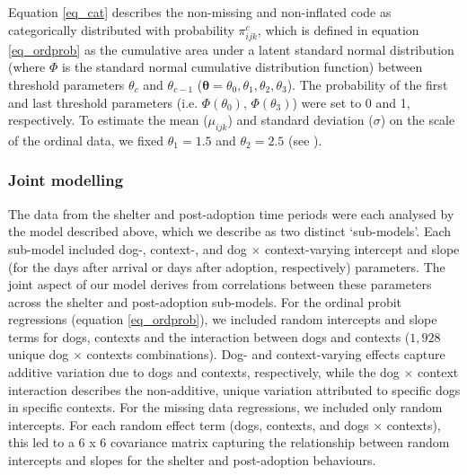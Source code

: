 \documentclass[12pt]{article}
\begin{document}
Equation \ref{eq_cat} describes the non-missing and non-inflated code as categorically distributed with probability $\pi_{ijk}^c$, which is defined in equation \ref{eq_ordprob} as the cumulative area under a latent standard normal distribution (where $\Phi$ is the standard normal cumulative distribution function) between threshold parameters $\theta_{c}$ and $\theta_{c-1}$ ($\boldsymbol{\theta} = {\theta_{0}, \theta_{1}, \theta_{2}, \theta_{3}}$). The probability of the first and last threshold parameters (i.e. $\Phi({\theta_{0}})$, $\Phi({\theta_{3}})$) were set to 0 and 1, respectively. To estimate the mean ($\mu_{ijk}$) and standard deviation ($\sigma$) on the scale of the ordinal data, we fixed $\theta_{1} = 1.5$ and $\theta_{2} = 2.5$ (see \cite{kruschke2014}).

\subsubsection{Joint modelling}
The data from the shelter and post-adoption time periods were each analysed by the model described above, which we describe as two distinct `sub-models'. Each sub-model included dog-, context-, and dog $\times$ context-varying intercept and slope (for the days after arrival or days after adoption, respectively) parameters. The joint aspect of our model derives from correlations between these parameters across the shelter and post-adoption sub-models. For the ordinal probit regressions (equation \ref{eq_ordprob}), we included random intercepts and slope terms for dogs, contexts and the interaction between dogs and contexts ($1,928$ unique dog $\times$ contexts combinations). Dog- and context-varying effects capture additive variation due to dogs and contexts, respectively, while the dog $\times$ context interaction describes the non-additive, unique variation attributed to specific dogs in specific contexts. For the missing data regressions, we included only random intercepts. For each random effect term (dogs, contexts, and dogs $\times$ contexts), this led to a 6 x 6 covariance matrix capturing the relationship between random intercepts and slopes for the shelter and post-adoption behaviours.
\end{document}
